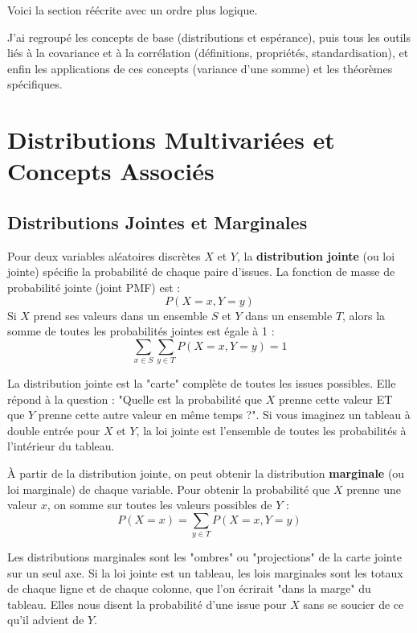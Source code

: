 Voici la section réécrite avec un ordre plus logique.

J'ai regroupé les concepts de base (distributions et espérance), puis tous les outils liés à la covariance et à la corrélation (définitions, propriétés, standardisation), et enfin les applications de ces concepts (variance d'une somme) et les théorèmes spécifiques.

\newpage
\section{Distributions Multivariées et Concepts Associés}

\subsection{Distributions Jointes et Marginales}

\begin{definitionbox}
Pour deux variables aléatoires discrètes $X$ et $Y$, la \textbf{distribution jointe} (ou loi jointe) spécifie la probabilité de chaque paire d'issues. La fonction de masse de probabilité jointe (joint PMF) est :
$$P(X=x, Y=y)$$
Si $X$ prend ses valeurs dans un ensemble $S$ et $Y$ dans un ensemble $T$, alors la somme de toutes les probabilités jointes est égale à 1 :
$$\sum_{x \in S} \sum_{y \in T} P(X=x, Y=y) = 1$$
\end{definitionbox}

\begin{intuitionbox}
La distribution jointe est la "carte" complète de toutes les issues possibles. Elle répond à la question : "Quelle est la probabilité que $X$ prenne cette valeur ET que $Y$ prenne cette autre valeur en même temps ?". Si vous imaginez un tableau à double entrée pour $X$ et $Y$, la loi jointe est l'ensemble de toutes les probabilités à l'intérieur du tableau.
\end{intuitionbox}

\begin{definitionbox}
À partir de la distribution jointe, on peut obtenir la distribution \textbf{marginale} (ou loi marginale) de chaque variable. Pour obtenir la probabilité que $X$ prenne une valeur $x$, on somme sur toutes les valeurs possibles de $Y$ :
$$P(X=x) = \sum_{y \in T} P(X=x, Y=y)$$
\end{definitionbox}

\begin{intuitionbox}
Les distributions marginales sont les "ombres" ou "projections" de la carte jointe sur un seul axe. Si la loi jointe est un tableau, les lois marginales sont les totaux de chaque ligne et de chaque colonne, que l'on écrirait "dans la marge" du tableau. Elles nous disent la probabilité d'une issue pour $X$ sans se soucier de ce qu'il advient de $Y$.
\end{intuitionbox}

